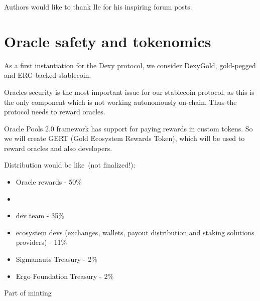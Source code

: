 \documentclass{article}   %
\newcommand{\authnote}[2]{\marginpar{\parbox{\marginparwidth}{\tiny %
  \textsf{#1 {\textcolor{blue}{notes: #2}}}}}%
  \textcolor{blue}{\textbf{\dag}}}
\newcommand{\authnote}[2]{
  \textsf{#1 \textcolor{blue}{: #2}}}
\newcommand{\authnote}[2]{}
\newcommand{\knote}[1]{{\authnote{\textcolor{green}{Alex notes}}{#1}}}
\begin{document}
Authors would like to thank Ile for his inspiring forum posts.

\section*{Oracle safety and tokenomics}

As a first instantiation for the Dexy protocol, we consider DexyGold, gold-pegged and ERG-backed stablecoin.

Oracles security is the most important issue for our stablecoin protocol, as this is the only component which is
not working autonomously on-chain. Thus the protocol needs to reward oracles.

Oracle Pools 2.0 framework \knote{link} has support for paying rewards in custom tokens. So we will create GERT (Gold
Ecosystem Rewards Token), which will be used to reward oracles and also developers.

Distribution would be like~(not finalized!):

\begin{itemize}
\item{Oracle rewards} - 50\%
\item \item{dev team} - 35\%
\item{ecosystem devs (exchanges, wallets, payout distribution and staking solutions providers)} - 11\%
\item{Sigmanauts Treasury} - 2\%
\item{Ergo Foundation Treasury} - 2\%
\end{itemize}

Part of minting






%
\end{document}
